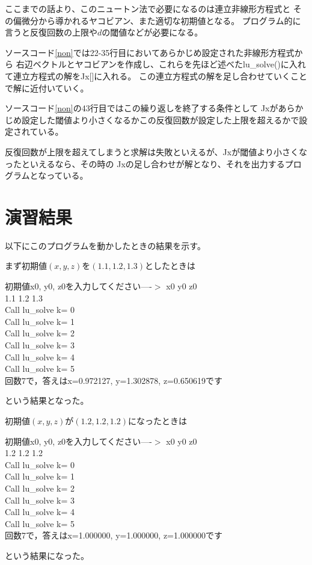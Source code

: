\documentclass[a4paper,11pt]{jsarticle}
\begin{document}
ここまでの話より、このニュートン法で必要になるのは連立非線形方程式と
その偏微分から導かれるヤコビアン、また適切な初期値となる。
プログラム的に言うと反復回数の上限や$d$の閾値などが必要になる。

ソースコード\ref{non}では22-35行目においてあらかじめ設定された非線形方程式から
右辺ベクトルとヤコビアンを作成し、これらを先ほど述べたlu\_solve()に入れて連立方程式の解をJx[]に入れる。
この連立方程式の解を足し合わせていくことで解に近付いていく。

ソースコード\ref{non}の43行目ではこの繰り返しを終了する条件として
Jxがあらかじめ設定した閾値より小さくなるかこの反復回数が設定した上限を超えるかで設定されている。

反復回数が上限を超えてしまうと求解は失敗といえるが、Jxが閾値より小さくなったといえるなら、その時の
Jxの足し合わせが解となり、それを出力するプログラムとなっている。

\section{演習結果}
以下にこのプログラムを動かしたときの結果を示す。

まず初期値$(x,y,z)$を$(1.1,1.2,1.3)$としたときは
\begin{shaded}
    \noindent
    初期値x0, y0, z0を入力してください----$>$ x0 y0 z0\\
    1.1 1.2 1.3\\
    Call lu\_solve k= 0\\
    Call lu\_solve k= 1\\
    Call lu\_solve k= 2\\
    Call lu\_solve k= 3\\
    Call lu\_solve k= 4\\
    Call lu\_solve k= 5\\
    回数7で，答えはx=0.972127, y=1.302878, z=0.650619です
\end{shaded}
という結果となった。

初期値$(x,y,z)$が$(1.2,1.2,1.2)$になったときは
\begin{shaded}
    \noindent
    初期値x0, y0, z0を入力してください----$>$ x0 y0 z0\\
    1.2 1.2 1.2\\
    Call lu\_solve k= 0\\
    Call lu\_solve k= 1\\
    Call lu\_solve k= 2\\
    Call lu\_solve k= 3\\
    Call lu\_solve k= 4\\
    Call lu\_solve k= 5\\
    回数7で，答えはx=1.000000, y=1.000000, z=1.000000です
\end{shaded}
という結果になった。
\end{document}
